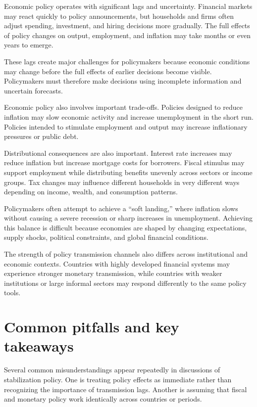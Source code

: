\documentclass[
  11pt,
  oneside]{book}
\begin{document}
Economic policy operates with significant lags and uncertainty. Financial markets may react quickly to policy announcements, but households and firms often adjust spending, investment, and hiring decisions more gradually. The full effects of policy changes on output, employment, and inflation may take months or even years to emerge.

These lags create major challenges for policymakers because economic conditions may change before the full effects of earlier decisions become visible. Policymakers must therefore make decisions using incomplete information and uncertain forecasts.

Economic policy also involves important trade-offs. Policies designed to reduce inflation may slow economic activity and increase unemployment in the short run. Policies intended to stimulate employment and output may increase inflationary pressures or public debt.

Distributional consequences are also important. Interest rate increases may reduce inflation but increase mortgage costs for borrowers. Fiscal stimulus may support employment while distributing benefits unevenly across sectors or income groups. Tax changes may influence different households in very different ways depending on income, wealth, and consumption patterns.

Policymakers often attempt to achieve a ``soft landing,'' where inflation slows without causing a severe recession or sharp increases in unemployment. Achieving this balance is difficult because economies are shaped by changing expectations, supply shocks, political constraints, and global financial conditions.

The strength of policy transmission channels also differs across institutional and economic contexts. Countries with highly developed financial systems may experience stronger monetary transmission, while countries with weaker institutions or large informal sectors may respond differently to the same policy tools.

\section{Common pitfalls and key takeaways}\label{common-pitfalls-and-key-takeaways-2}

Several common misunderstandings appear repeatedly in discussions of stabilization policy. One is treating policy effects as immediate rather than recognizing the importance of transmission lags. Another is assuming that fiscal and monetary policy work identically across countries or periods.
\end{document}
